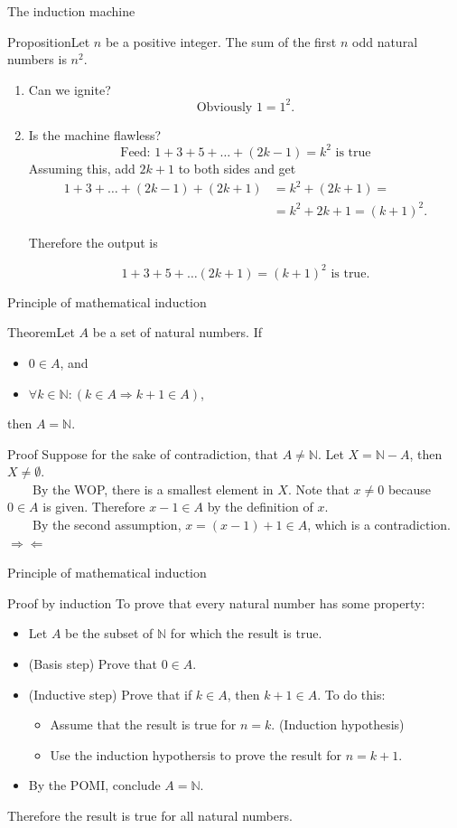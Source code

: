 \documentclass{beamer}
\def\bl[#1]#2{\begin{block}{#1}#2\end{block}}
\def\enumb{\begin{enumerate}}
\def\enume{\end{enumerate}}
\def\itemb{\begin{itemize}}
\def\iteme{\end{itemize}}
\begin{document}
\begin{frame}{The induction machine}
\bl[Proposition]{Let $n$ be a positive integer. The sum of the first $n$ odd natural numbers is $n^2$.}
\enumb
\item Can we ignite? 
\[
\textrm{Obviously } 1=1^2.
\]
\item Is the machine flawless? 
\[
\textrm{Feed: $1+3+5+\dots+(2k-1)=k^2$ is true}
\]
Assuming this, add $2k+1$ to both sides and get
\begin{align*}
1+3+\dots+(2k-1)+(2k+1)&=k^2+(2k+1)=\\
&=k^2+2k+1=(k+1)^2.
\end{align*}\vspace{-0.8cm}

Therefore the output is\vspace{-0.3cm}

\[
1+3+5+\dots(2k+1)=(k+1)^2\textrm{ is true}.
\]
\enume
\end{frame}

\begin{frame}{Principle of mathematical induction}
\bl[Theorem]{Let $A$ be a set of natural numbers. If 
\itemb
\item $0\in A$, and
\item $\forall k\in\mathbb{N}: ( k\in A\Rightarrow k+1\in A)$,
\iteme
then $A=\mathbb{N}$.}
\bl[Proof]{
Suppose for the sake of contradiction, that $A\neq\mathbb{N}$. Let $X=\mathbb{N}-A$, then $X\neq\emptyset$.\\
~~~~By the WOP, there is a smallest element in $X$. Note that $x\neq 0$ because $0\in A$ is given. Therefore $x-1\in A$ by the definition of $x$. \\
~~~~By the second assumption, $x=(x-1)+1\in A$, which is a contradiction.$\Rightarrow\Leftarrow$
}
\end{frame}

\begin{frame}{Principle of mathematical induction}
\bl[Proof by induction]{
To prove that every natural number has some property:\\
\itemb
\item Let $A$ be the subset of $\mathbb{N}$ for which the result is true.
\item (Basis step) Prove that $0\in A$.
\item (Inductive step) Prove that if $k\in A$, then $k+1\in A$. To do this:
\itemb
\item Assume that the result is true for $n=k$. (Induction hypothesis)
\item Use the induction hypothersis to prove the result for $n=k+1$.
\iteme
\item By the POMI, conclude $A=\mathbb{N}$.
\iteme
Therefore the result is true for all natural numbers.
}
\end{frame}
\end{document}
